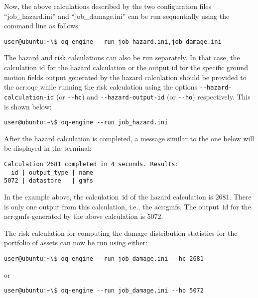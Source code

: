 Now, the above calculations described by the two configuration files
``job\_hazard.ini'' and ``job\_damage.ini'' can be run sequentially using the
command line as follows:

\begin{verbatim}
user@ubuntu:~\$ oq-engine --run job_hazard.ini,job_damage.ini
\end{verbatim}

The hazard and risk calculations can also be run separately. In that case, the
calculation id for the hazard calculation or the output id for the specific
ground motion fields output generated by the hazard calculation should be
provided to the \glsdesc{acr:oqe} while running the risk calculation using the
options \Verb+--hazard-calculation-id+ (or \Verb+--hc+) and 
\Verb+--hazard-output-id+ (or \Verb+--ho+) respectively. This is shown below:

\begin{verbatim}
user@ubuntu:~\$ oq-engine --run job_hazard.ini
\end{verbatim}

After the hazard calculation is completed, a message similar to the one below
will be displayed in the terminal:

\begin{verbatim}
Calculation 2681 completed in 4 seconds. Results:
  id | output_type | name
5072 | datastore   | gmfs
\end{verbatim}

In the example above, the calculation~id of the hazard calculation is 2681.
There is only one output from this calculation, i.e., the \glspl{acr:gmf}. The
output~id for the \glspl{acr:gmf} generated by the above calculation is 5072.

The risk calculation for computing the damage distribution statistics for the
portfolio of \glspl{asset} can now be run using either:

\begin{verbatim}
user@ubuntu:~\$ oq-engine --run job_damage.ini --hc 2681
\end{verbatim}

or

\begin{verbatim}
user@ubuntu:~\$ oq-engine --run job_damage.ini --ho 5072
\end{verbatim}

